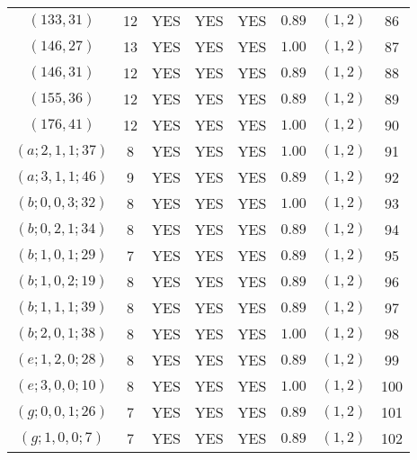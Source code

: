 \begin{longtable}{|c|c|c|c|c|c|c|c|}
$(133,31)$ & 12 & YES & YES & YES & $0.89$ & $(1,2)$ & 86\\
$(146,27)$ & 13 & YES & YES & YES & $1.00$ & $(1,2)$ & 87\\
$(146,31)$ & 12 & YES & YES & YES & $0.89$ & $(1,2)$ & 88\\
$(155,36)$ & 12 & YES & YES & YES & $0.89$ & $(1,2)$ & 89\\
$(176,41)$ & 12 & YES & YES & YES & $1.00$ & $(1,2)$ & 90\\
$(a;2,1,1;37)$ & 8 & YES & YES & YES & $1.00$ & $(1,2)$ & 91\\
$(a;3,1,1;46)$ & 9 & YES & YES & YES & $0.89$ & $(1,2)$ & 92\\
$(b;0,0,3;32)$ & 8 & YES & YES & YES & $1.00$ & $(1,2)$ & 93\\
$(b;0,2,1;34)$ & 8 & YES & YES & YES & $0.89$ & $(1,2)$ & 94\\
$(b;1,0,1;29)$ & 7 & YES & YES & YES & $0.89$ & $(1,2)$ & 95\\
$(b;1,0,2;19)$ & 8 & YES & YES & YES & $0.89$ & $(1,2)$ & 96\\
$(b;1,1,1;39)$ & 8 & YES & YES & YES & $0.89$ & $(1,2)$ & 97\\
$(b;2,0,1;38)$ & 8 & YES & YES & YES & $1.00$ & $(1,2)$ & 98\\
$(e;1,2,0;28)$ & 8 & YES & YES & YES & $0.89$ & $(1,2)$ & 99\\
$(e;3,0,0;10)$ & 8 & YES & YES & YES & $1.00$ & $(1,2)$ & 100\\
$(g;0,0,1;26)$ & 7 & YES & YES & YES & $0.89$ & $(1,2)$ & 101\\
$(g;1,0,0;7)$ & 7 & YES & YES & YES & $0.89$ & $(1,2)$ & 102
\end{longtable}

